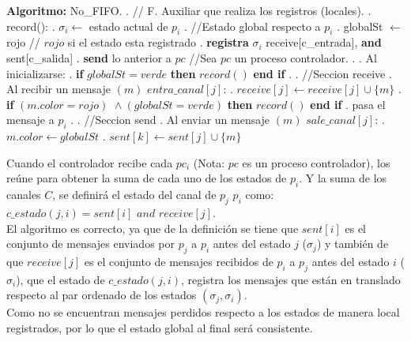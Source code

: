     \hfill\break
    \hspace*{.2cm} {\bf Algoritmo:} No\_FIFO.
    \hfill{}. // F. Auxiliar que realiza los registros (locales).
    \hfill{}. record():
    \hfill{}. $\sigma_i\leftarrow$ estado actual de $p_i$
    \hfill{}. //Estado global respecto a $p_i$
    \hfill{}. globalSt $\leftarrow$ rojo \hspace{0.5cm}  // $rojo$ si el estado esta registrado
    \hfill{}. {\bf registra} $\sigma_i$ receive[c\_entrada], {\bf and} sent[c\_salida]
    \hfill{}. {\bf send} lo anterior a $pc$ \hspace{0.5cm}  //Sea $pc$ un proceso controlador.
    \hfill{}.
    \hfill{}. Al inicializarse:
    \hfill{}. {\bf if} $globalSt = verde$ {\bf then} $record()$ {\bf end if}
    \hfill{}.
    \hfill{}. //Seccion receive
    \hfill{}. Al recibir un mensaje $(m)$ $entra\_canal[j]$:
    \hfill{}. $receive[j] \leftarrow receive[j] \cup \{m\}$
    \hfill{}. {\bf if} $(m.color = rojo) \,\,\land (globalSt = verde)$ {\bf then} $record()$ {\bf end if}
    \hfill{}. pasa el mensaje a $p_i$
    \hfill{}.
    \hfill{}. //Seccion send
    \hfill{}. Al enviar un mensaje $(m)$ $sale\_canal[j]$:
    \hfill{}. $m.color \leftarrow globalSt$
    \hfill{}. $sent[k] \leftarrow sent[j] \cup \{m\}$
    \hfill\break

    \newpage
    Cuando el controlador recibe cada $pc_i$ (Nota: $pc$ es un proceso controlador),
    los reúne para obtener la suma de cada uno de los estados de $p_i$. Y la suma de
    los canales $C$, se definirá el estado del canal de $p_j$ $p_i$ como:\\
    $c\_estado(j,i)= sent[i] \,\, and \,\, receive[j]$.\\

    El algoritmo es correcto, ya que de la definición se tiene que $sent[i]$ es el
    conjunto de mensajes enviados por $p_j$ a $p_i$ antes del estado $j$ ($\sigma_j$)
    y también de que $receive[j]$ es el conjunto de mensajes recibidos de $p_i$ a $p_j$
    antes del estado $i$ ($\sigma_i$), que el estado de $c\_estado(j,i)$, registra los
    mensajes que están en translado respecto al par ordenado de los estados
    $(\sigma_j,\sigma_i)$.\\

    Como no se encuentran mensajes perdidos respecto a los estados de manera local registrados,
    por lo que el estado global al final será consistente.
